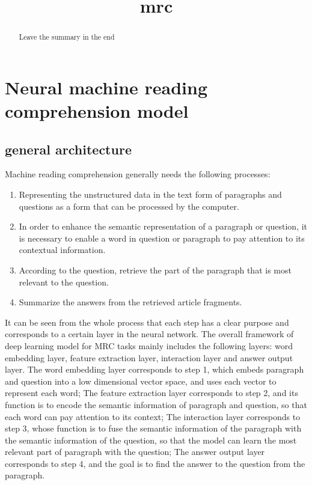 \documentclass{article}
\title{mrc}
\date{}
\begin{document}
    \maketitle %
	\begin{abstract}
		Leave the summary in the end
	\end{abstract}





\section{Neural machine reading comprehension model}
\subsection{general architecture}
Machine reading comprehension generally needs the following processes:

\begin{enumerate}
	\item Representing the unstructured data in the text form of paragraphs and questions as a form that can be processed by the computer.
	\item In order to enhance the semantic representation of a paragraph or question, it is necessary to enable a word in question or paragraph to pay attention to its contextual information.
	\item According to the question, retrieve the part of the paragraph that is most relevant to the question.
	\item Summarize the answers from the retrieved article fragments.
\end{enumerate}

It can be seen from the whole process that each step has a clear purpose and corresponds to a certain layer in the neural network. The overall framework of 
deep learning model for MRC tasks mainly includes the following layers: word embedding layer, feature extraction layer, interaction layer and answer output layer. 
The word embedding layer corresponds to step 1, which embeds paragraph and question into a low dimensional vector space, and uses each vector to represent each word; 
The feature extraction layer corresponds to step 2, and its function is to encode the semantic information of paragraph and question, so that each word can pay attention to its context;
The interaction layer corresponds to step 3, whose function is to fuse the semantic information of the paragraph with the semantic information of the question, so that 
the model can learn the most relevant part of paragraph with the question; 
The answer output layer corresponds to step 4, and the goal is to find the answer to the question from the paragraph.
\end{document}
